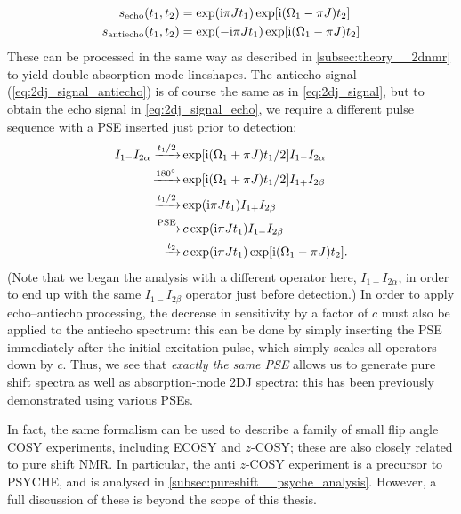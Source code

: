 \begin{align}
    s_\text{echo}(t_1, t_2) &= \exp(\mathrm{i}\pi J t_1) \exp[\mathrm{i}(\Omega_1 - \pi J) t_2] \label{eq:2dj_signal_echo} \\
    s_\text{antiecho}(t_1, t_2) &= \exp(-\mathrm{i}\pi J t_1) \exp[\mathrm{i}(\Omega_1 - \pi J) t_2] \label{eq:2dj_signal_antiecho}
\end{align}
These can be processed in the same way as described in \cref{subsec:theory__2dnmr} to yield double absorption-mode lineshapes.
The antiecho signal (\cref{eq:2dj_signal_antiecho}) is of course the same as in \cref{eq:2dj_signal}, but to obtain the echo signal in \cref{eq:2dj_signal_echo}, we require a different pulse sequence with a PSE inserted just prior to detection:
\begin{align}
    \label{eq:2dj_signal_echo_ctp}
    I_{1-}I_{2\alpha} \xrightarrow[]{t_1/2} &\exp[\mathrm{i}(\Omega_1 + \pi J)t_1/2] I_{1-}I_{2\alpha} \\
    \xrightarrow[]{\ang{180}} &\exp[\mathrm{i}(\Omega_1 + \pi J)t_1/2] I_{1+}I_{2\beta} \\
    \xrightarrow[]{t_1/2} &\exp(\mathrm{i} \pi J t_1) I_{1+}I_{2\beta} \\
    \xrightarrow[]{\text{PSE}} &\,c \exp(\mathrm{i} \pi J t_1) I_{1-}I_{2\beta} \\
    \xrightarrow[]{t_2} &\,c \exp(\mathrm{i} \pi J t_1) \exp[\mathrm{i}(\Omega_1 - \pi J) t_2].
\end{align}
(Note that we began the analysis with a different operator here, $I_{1-}I_{2\alpha}$, in order to end up with the same $I_{1-}I_{2\beta}$ operator just before detection.)
In order to apply echo--antiecho processing, the decrease in sensitivity by a factor of $c$ must also be applied to the antiecho spectrum: this can be done by simply inserting the PSE immediately after the initial excitation pulse, which simply scales all operators down by $c$.
Thus, we see that \textit{exactly the same PSE} allows us to generate pure shift spectra as well as absorption-mode 2DJ spectra: this has been previously demonstrated using various PSEs.\autocite{Pell2007JMR,Foroozandeh2015CC}

In fact, the same formalism can be used to describe a family of small flip angle COSY experiments, including ECOSY\autocite{Griesinger1985JACS,Sorensen1985JACS,Griesinger1986JCP} and $z$-COSY\autocite{Oschkinat1986JMR,Pell2007MRC,Moutzouri2020ACIE}; these are also closely related to pure shift NMR.
In particular, the anti $z$-COSY experiment is a precursor to PSYCHE, and is analysed in \cref{subsec:pureshift__psyche_analysis}.
However, a full discussion of these is beyond the scope of this thesis.
